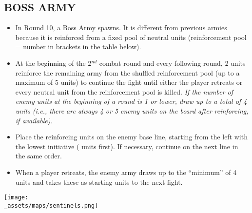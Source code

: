 \begin{multicols}{2}
\subsection*{\MakeUppercase{Boss Army}}

\begin{itemize}
  \item In Round 10, a Boss Army spawns. It is different from previous armies because it is reinforced from a fixed pool of neutral units (reinforcement pool = number in brackets in the table below).
  \item At the beginning of the 2$^{nd}$ combat round and every following round, 2 units reinforce the remaining army from the shuffled reinforcement pool (up to a maximum of 5 units) to continue the fight until either the player retreats or every neutral unit from the reinforcement pool is killed. \textit{If the number of enemy units at the beginning of a round is 1 or lower, draw up to a total of 4 units (i.e., there are always 4 or 5 enemy units on the board after reinforcing, if available).}
  \item Place the reinforcing units on the enemy base line, starting from the left with the lowest initiative ( units first). If necessary, continue on the next line in the same order.
  \item When a player retreats, the enemy army draws up to the ``minimum'' of 4 units and takes these as starting units to the next fight.
\end{itemize}

\columnbreak

\vspace*{3.5em}
\hspace{-10em}
\texttt{[image: \\\_assets/maps/sentinels.png]}

\end{multicols}

